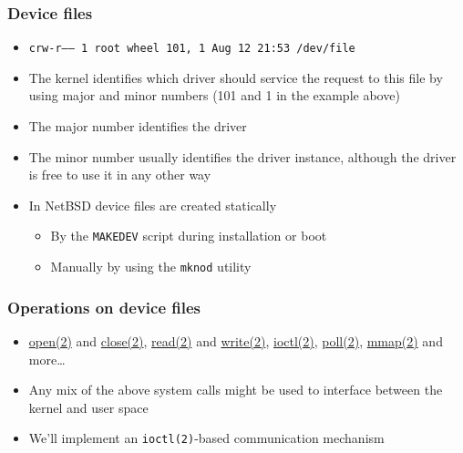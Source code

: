 \documentclass[dvipsnames,table]{beamer}
\begin{document}
\begin{frame}
\frametitle{Device files}
\begin{itemize}
	\scriptsize
	\item {\tt crw-r-----  1 root  wheel  101, 1 Aug 12 21:53 /dev/file}
	\normalsize
	\item The kernel identifies which driver should service the request to this file by using major and minor numbers (101 and 1 in the example above)
	\item The major number identifies the driver
	\item The minor number usually identifies the driver instance, although the driver is free to use it in any other way
	\item In NetBSD device files are created statically
	\begin{itemize}
		\item By the {\tt MAKEDEV} script during installation or boot
		\item Manually by using the {\tt mknod} utility
	\end{itemize}
\end{itemize}
\end{frame}

\begin{frame}
\frametitle{Operations on device files}
\begin{itemize}
	\item \href{http://netbsd.gw.com/cgi-bin/man-cgi?read++NetBSD-current}{open(2)} and \href{http://netbsd.gw.com/cgi-bin/man-cgi?read++NetBSD-current}{close(2)}, \href{http://netbsd.gw.com/cgi-bin/man-cgi?read++NetBSD-current}{read(2)} and \href{http://netbsd.gw.com/cgi-bin/man-cgi?write++NetBSD-current}{write(2)}, \href{http://netbsd.gw.com/cgi-bin/man-cgi?write++NetBSD-current}{ioctl(2)}, \href{http://netbsd.gw.com/cgi-bin/man-cgi?poll++NetBSD-current}{poll(2)}, \href{http://netbsd.gw.com/cgi-bin/man-cgi?write++NetBSD-current}{mmap(2)} and more\dots
	\item Any mix of the above system calls might be used to interface between the kernel and user space
	\item We'll implement an {\tt ioctl(2)}-based communication mechanism

\end{itemize}
\end{frame}
\end{document}
